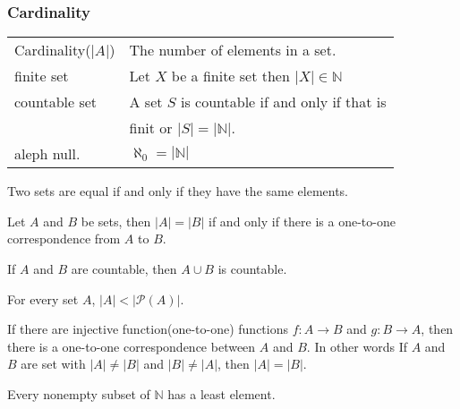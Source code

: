 \documentclass[5pt]{article}
\begin{document}
\begin{multicols}{2}
\subsubsection{Cardinality}
\begin{tabular}{ll}
    Cardinality($|A|$)  & The number of elements in a set.\\
    finite set          & Let $X$ be a finite set then $|X|\in \mathbb{N}$\\
    countable set       & A set $S$ is countable if and only if that is\\
                        & finit or $|S|=|\mathbb{N}|$.\\
    aleph null.         & $\aleph_0=|\mathbb{N}|$\\
\end{tabular}

\begin{axiom}
    Two sets are equal if and only if they have the same elements.
\end{axiom}

\begin{theorem}
    Let $A$ and $B$ be sets, then $|A|=|B|$ if and only if there is a one-to-one correspondence from $A$ to $B$.
\end{theorem}

\begin{theorem}
    If $A$ and $B$ are countable, then $A\cup B$ is countable. 
\end{theorem}

\begin{theorem}
    For every set $A$, $|A|<|\mathcal{P}(A)|$.
\end{theorem}

\begin{theorem}
     If there are injective function(one-to-one) functions $f\!:A\to B$ and $g\!:B\to A$, then there is a one-to-one correspondence between $A$ and $B$. 
     In other words If $A$ and $B$ are set with $|A|\neq|B|$ and $|B|\neq|A|$, then $|A|=|B|$.
\end{theorem}

\begin{theorem}
    Every nonempty subset of $\mathbb{N}$ has a least element.
\end{theorem}


\end{multicols}
\end{document}
